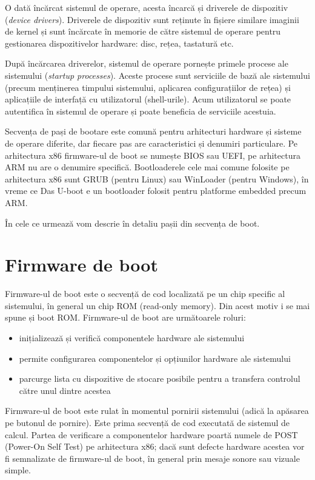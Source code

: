 O dată încărcat sistemul de operare, acesta încarcă și driverele de dispozitiv
(\textit{device drivers}). Driverele de dispozitiv sunt reținute în fișiere similare
imaginii de kernel și sunt încărcate în memorie de către sistemul de operare
pentru gestionarea dispozitivelor hardware: disc, rețea, tastatură etc.

După încărcarea driverelor, sistemul de operare pornește primele procese ale
sistemului (\textit{startup processes}). Aceste procese sunt serviciile de bază ale
sistemului (precum menținerea timpului sistemului, aplicarea configurațiilor de
rețea) și aplicațiile de interfață cu utilizatorul (shell-urile). Acum
utilizatorul se poate autentifica în sistemul de operare și poate beneficia de
serviciile acestuia.

Secvența de pași de bootare este comună pentru arhitecturi hardware și sisteme
de operare diferite, dar fiecare pas are caracteristici și denumiri particulare.
Pe arhitectura x86 firmware-ul de boot se numește BIOS sau UEFI, pe arhitectura
ARM nu are o denumire specifică. Bootloaderele cele mai comune folosite pe arhitectura x86 sunt
GRUB (pentru Linux) sau WinLoader (pentru Windows), în vreme ce Das U-boot e un
bootloader folosit pentru platforme embedded precum ARM.

În cele ce urmează vom descrie în detaliu pașii din secvența de boot.

\section{Firmware de boot}
\label{sec:boot-firmware}

Firmware-ul de boot este o secvență de cod localizată pe un chip specific al
sistemului, în general un chip ROM (read-only memory). Din acest motiv i se mai
spune și boot ROM. Firmware-ul de boot are următoarele roluri:


\begin{itemize}
	\item inițializează și verifică componentele hardware ale sistemului
	\item permite configurarea componentelor și opțiunilor hardware ale
		sistemului
	\item parcurge lista cu dispozitive de stocare posibile pentru a
		transfera controlul către unul dintre acestea
\end{itemize}

Firmware-ul de boot este rulat în momentul pornirii sistemului (adică la
apăsarea pe butonul de pornire). Este prima secvență de cod executată de
sistemul de calcul. Partea de verificare a componentelor hardware poartă numele
de POST  (Power-On Self Test) pe arhitectura
x86; dacă sunt defecte hardware acestea vor fi semnalizate de firmware-ul de
boot, în general prin mesaje sonore sau vizuale simple.

